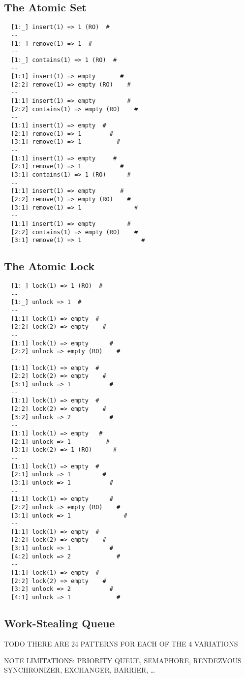 \subsection{The Atomic Set}

\begin{verbatim}
  [1:_] insert(1) => 1 (RO)  #
  --
  [1:_] remove(1) => 1  #
  --
  [1:_] contains(1) => 1 (RO)  #
  --
  [1:1] insert(1) => empty       #
  [2:2] remove(1) => empty (RO)    #
  --
  [1:1] insert(1) => empty         #
  [2:2] contains(1) => empty (RO)    #
  --
  [1:1] insert(1) => empty  #
  [2:1] remove(1) => 1        #
  [3:1] remove(1) => 1          #
  --
  [1:1] insert(1) => empty     #
  [2:1] remove(1) => 1           #
  [3:1] contains(1) => 1 (RO)      #
  --
  [1:1] insert(1) => empty       #
  [2:2] remove(1) => empty (RO)    #
  [3:1] remove(1) => 1               #
  --
  [1:1] insert(1) => empty         #
  [2:2] contains(1) => empty (RO)    #
  [3:1] remove(1) => 1                 #
\end{verbatim}

\subsection{The Atomic Lock}

\begin{verbatim}
  [1:_] lock(1) => 1 (RO)  #
  --
  [1:_] unlock => 1  #
  --
  [1:1] lock(1) => empty  #
  [2:2] lock(2) => empty    #
  --
  [1:1] lock(1) => empty      #
  [2:2] unlock => empty (RO)    #
  --
  [1:1] lock(1) => empty  #
  [2:2] lock(2) => empty    #
  [3:1] unlock => 1           #
  --
  [1:1] lock(1) => empty  #
  [2:2] lock(2) => empty    #
  [3:2] unlock => 2           #
  --
  [1:1] lock(1) => empty   #
  [2:1] unlock => 1          #
  [3:1] lock(2) => 1 (RO)      #
  --
  [1:1] lock(1) => empty  #
  [2:1] unlock => 1         #
  [3:1] unlock => 1           #
  --
  [1:1] lock(1) => empty      #
  [2:2] unlock => empty (RO)    #
  [3:1] unlock => 1               #
  --
  [1:1] lock(1) => empty  #
  [2:2] lock(2) => empty    #
  [3:1] unlock => 1           #
  [4:2] unlock => 2             #
  --
  [1:1] lock(1) => empty  #
  [2:2] lock(2) => empty    #
  [3:2] unlock => 2           #
  [4:1] unlock => 1             #
\end{verbatim}

\subsection{Work-Stealing Queue}

TODO THERE ARE 24 PATTERNS FOR EACH OF THE 4 VARIATIONS

NOTE LIMITATIONS: PRIORITY QUEUE, SEMAPHORE, RENDEZVOUS SYNCHRONIZER,
EXCHANGER, BARRIER, …
